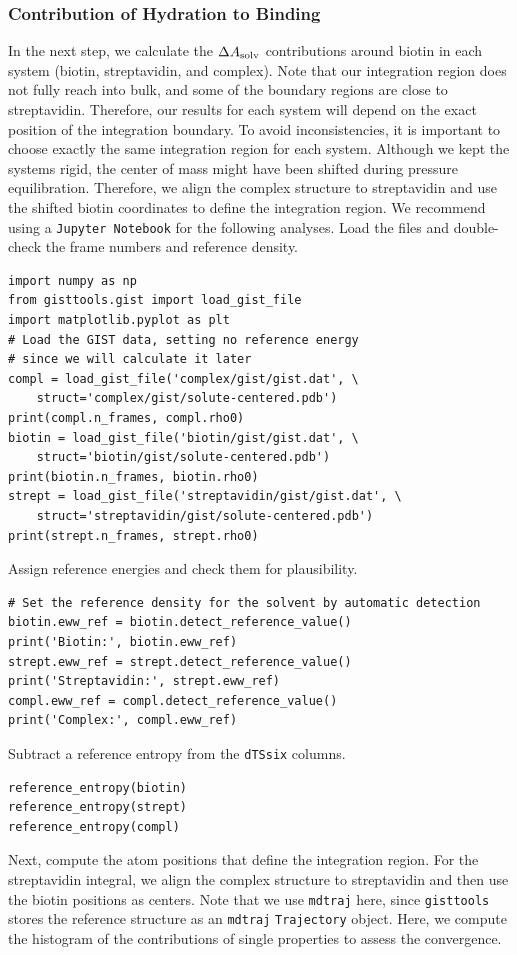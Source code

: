 \documentclass[9pt,tutorial,pubversion]{livecoms}
\newcommand{\dasolv}{\Delta A_\textup{solv}}
\newcommand{\software}{\texttt}
\newcommand\inlinecode{\texttt}
\begin{document}
\subsubsection{Contribution of Hydration to Binding}
\label{sec:binding_contributions}
In the next step, we calculate the $\dasolv$ contributions around biotin in each system (biotin, streptavidin, and complex).
Note that our integration region does not fully reach into bulk, and some of the boundary regions are close to streptavidin. 
Therefore, our results for each system will depend on the exact position of the integration boundary. 
To avoid inconsistencies, it is important to choose exactly the same integration region for each system.
Although we kept the systems rigid, the center of mass might have been shifted during pressure equilibration.
Therefore, we align the complex structure to streptavidin and use the shifted biotin coordinates to define the integration region.
We recommend using a \software{Jupyter Notebook} for the following analyses.
Load the files and double-check the frame numbers and reference density.
\begin{lstlisting}[style=python]
import numpy as np
from gisttools.gist import load_gist_file
import matplotlib.pyplot as plt
# Load the GIST data, setting no reference energy
# since we will calculate it later
compl = load_gist_file('complex/gist/gist.dat', \
    struct='complex/gist/solute-centered.pdb')
print(compl.n_frames, compl.rho0)
biotin = load_gist_file('biotin/gist/gist.dat', \
    struct='biotin/gist/solute-centered.pdb')
print(biotin.n_frames, biotin.rho0)
strept = load_gist_file('streptavidin/gist/gist.dat', \
    struct='streptavidin/gist/solute-centered.pdb')
print(strept.n_frames, strept.rho0)
\end{lstlisting}
Assign reference energies and check them for plausibility.

\begin{lstlisting}[style=python]
# Set the reference density for the solvent by automatic detection
biotin.eww_ref = biotin.detect_reference_value()
print('Biotin:', biotin.eww_ref)
strept.eww_ref = strept.detect_reference_value()
print('Streptavidin:', strept.eww_ref)
compl.eww_ref = compl.detect_reference_value()
print('Complex:', compl.eww_ref)
\end{lstlisting}
Subtract a reference entropy from the \inlinecode{dTSsix} columns.

\begin{lstlisting}[style=python]
reference_entropy(biotin)
reference_entropy(strept)
reference_entropy(compl)
\end{lstlisting}
Next, compute the atom positions that define the integration region.
For the streptavidin integral, we align the complex structure to streptavidin and then use the biotin positions as centers. 
Note that we use \software{mdtraj} here, since \software{gisttools} stores the reference structure as an \software{mdtraj} \inlinecode{Trajectory} object.
Here, we compute the histogram of the contributions of single properties to assess the convergence.
\end{document}
